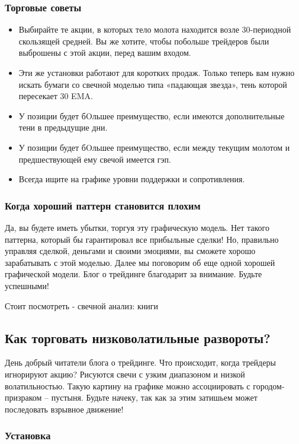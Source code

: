 \documentclass{book}
\begin{document}
\subsubsection{Торговые советы}
\begin{itemize}
\item     Выбирайте те акции, в которых тело молота находится возле 30-периодной скользящей средней. Вы же хотите, чтобы побольше трейдеров были выброшены с этой акции, перед вашим входом.
\item     Эти же установки работают для коротких продаж. Только теперь вам нужно искать бумаги со свечной моделью типа «падающая звезда», тень которой пересекает 30 EMA.
\item     У позиции будет бOльшее преимущество, если имеются дополнительные тени в предыдущие дни.
\item     У позиции будет бOльшее преимущество, если между текущим молотом и предшествующей ему свечой имеется гэп.
\item     Всегда ищите на графике уровни поддержки и сопротивления.
\end{itemize}

\subsubsection{Когда хороший паттерн становится плохим}

Да, вы будете иметь убытки, торгуя эту графическую модель. Нет такого паттерна, который бы гарантировал все прибыльные сделки! Но, правильно управляя сделкой, деньгами и своими эмоциями, вы сможете хорошо зарабатывать с этой моделью. Далее мы поговорим об еще одной хорошей графической модели. Блог о трейдинге благодарит за внимание. Будьте успешными!


Стоит посмотреть - свечной анализ: книги

\subsection{Как торговать низковолатильные развороты?}

День добрый читатели блога о трейдинге. Что происходит, когда трейдеры
игнорируют акцию? Рисуются свечи с узким диапазоном и низкой
волатильностью. Такую картину на графике можно ассоциировать с
городом-призраком – пустыня. Будьте начеку, так как за этим затишьем
может последовать взрывное движение!

\subsubsection{Установка}
\end{document}
